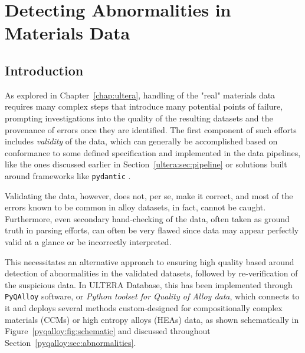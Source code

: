 \chapter{Detecting Abnormalities in Materials Data}  \label{chap:pyqalloy}


\section{Introduction} \label{pyqalloy:sec:intro}

As explored in Chapter~\ref{chap:ultera}, handling of the "real" materials data requires many complex steps that introduce many potential points of failure, prompting investigations into the quality of the resulting datasets and the provenance of errors once they are identified. The first component of such efforts includes \emph{validity} of the data, which can generally be accomplished based on conformance to some defined specification and implemented in the data pipelines, like the ones discussed earlier in Section~\ref{ultera:sec:pipeline} or solutions built around frameworks like \texttt{pydantic} \cite{WelcomePydantic}.

Validating the data, however, does not, per se, make it correct, and most of the errors known to be common in alloy datasets, in fact, cannot be caught. Furthermore, even secondary hand-checking of the data, often taken as ground truth in parsing efforts, can often be very flawed since data may appear perfectly valid at a glance or be incorrectly interpreted.

This necessitates an alternative approach to ensuring high quality based around detection of abnormalities in the validated datasets, followed by re-verification of the suspicious data. In ULTERA Database, this has been implemented through \texttt{PyQAlloy} software, or \textit{Python toolset for Quality of Alloy data}, which connects to it and deploys several methods custom-designed for compositionally complex materials (CCMs) or high entropy alloys (HEAs) data, as shown schematically in Figure~\ref{pyqalloy:fig:schematic} and discussed throughout Section~\ref{pyqalloy:sec:abnormalities}.

